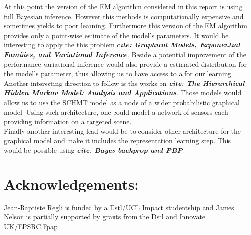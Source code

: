 \documentclass[a4paper,11pt]{report}
\begin{document}
		At this point the version of the EM algorithm considered in this report is using full Bayesian inference. However this methods is computationally expensive and sometimes yields to poor learning. Furthermore this version of the EM algorithm provides only a point-wise estimate of the model's parameters. It would be interesting to apply  the this problem \textbf{\textit{cite: Graphical Models, Exponential Families, and Variational Inference}}. Beside a potential improvement of the performance variational inference would also provide a estimated distribution for the model's parameter, thus allowing us to have access to a  for our learning.\\
		
		Another interesting direction to follow is the works on  \textbf{\textit{cite: The Hierarchical Hidden Markov Model: Analysis and Applications}}. Those models would allow us to use the SCHMT model as a node of a wider probabilistic graphical model. Using such architecture, one could model a network of sensors each providing information on a targeted scene.\\
		
		Finally another interesting lead would be to consider other architecture for the graphical model and make it includes the representation learning step. This would be possible using  
     \textbf{\textit{cite: Bayes backprop and PBP}}.
    
\chapter{Acknowledgements:}
	Jean-Baptiste Regli is funded by a Dstl/UCL Impact studentship and James Nelson is partially supported by grants from the Dstl and Innovate UK/EPSRC.Fpap

	

\nocite{*}

\end{document}
